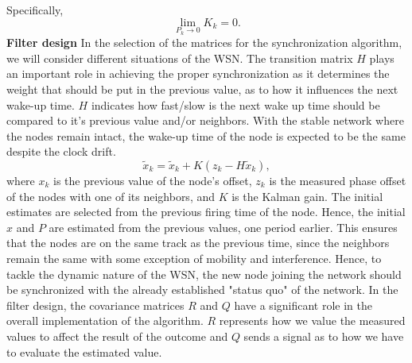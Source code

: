 \documentclass[journal]{IEEEtran}
\begin{document}
Specifically,
\begin{equation}
\mathop {\lim }\limits_{P_k \to 0 } {K_k} = 0.
\end{equation}
\textbf{Filter design} \newline
In the selection of the matrices for the synchronization algorithm,
we will consider different situations of the WSN.
\newline
The transition matrix $H$ plays an important role in achieving
the proper synchronization as it determines the weight that should
be put in the previous value, as to how it influences the next
wake-up time. $H$ indicates how fast/slow is the next wake up time should be compared
to it's previous value and/or neighbors. With the stable network where the nodes remain intact,
the wake-up time of the node is expected to be the same despite the
clock drift.
\begin{equation}
\tilde x_k = \tilde x_k + K(z_k-H\tilde x_k) \label{diff},
\end{equation}
where $x_k$ is the previous value of the node's offset, $z_k$ is the measured phase offset of the nodes with one of its neighbors,
and $K$ is the Kalman gain. \newline
The initial estimates are selected from the previous firing time of the node.
Hence, the initial $x$ and $P$ are estimated from the previous values, one period earlier.
This ensures that the nodes are on the same track as the previous time, since the neighbors
remain the same with some exception of mobility and interference.
Hence, to tackle the dynamic nature of the WSN, the
new node joining the network should be synchronized with the already
established "status quo" of the network. 
In the filter design, the covariance matrices $R$ and $Q$ have a significant
role in the overall implementation of the algorithm. $R$ represents how
we value the measured values to affect the result of the outcome and $Q$
sends a signal as to how we have to evaluate the estimated
value.
\end{document}
